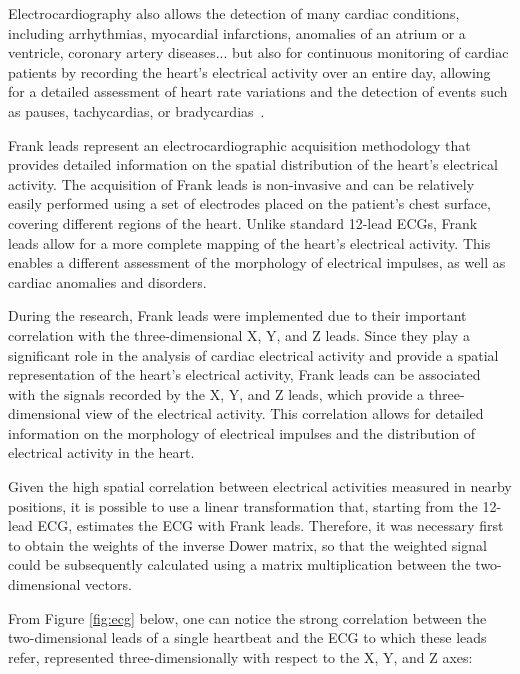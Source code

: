 \documentclass[12pt,italian]{report}
\begin{document}
Electrocardiography also allows the detection of many cardiac conditions, including arrhythmias, myocardial infarctions, anomalies of an atrium or a ventricle, coronary artery diseases... but also for continuous monitoring of cardiac patients by recording the heart's electrical activity over an entire day, allowing for a detailed assessment of heart rate variations and the detection of events such as pauses, tachycardias, or bradycardias~\cite{classification}.

Frank leads represent an electrocardiographic acquisition methodology that provides detailed information on the spatial distribution of the heart's electrical activity. The acquisition of Frank leads is non-invasive and can be relatively easily performed using a set of electrodes placed on the patient's chest surface, covering different regions of the heart. Unlike standard 12-lead ECGs, Frank leads allow for a more complete mapping of the heart's electrical activity. This enables a different assessment of the morphology of electrical impulses, as well as cardiac anomalies and disorders.

During the research, Frank leads were implemented due to their important correlation with the three-dimensional X, Y, and Z leads. Since they play a significant role in the analysis of cardiac electrical activity and provide a spatial representation of the heart's electrical activity, Frank leads can be associated with the signals recorded by the X, Y, and Z leads, which provide a three-dimensional view of the electrical activity. This correlation allows for detailed information on the morphology of electrical impulses and the distribution of electrical activity in the heart.

Given the high spatial correlation between electrical activities measured in nearby positions, it is possible to use a linear transformation that, starting from the 12-lead ECG, estimates the ECG with Frank leads. Therefore, it was necessary first to obtain the weights of the inverse Dower matrix, so that the weighted signal could be subsequently calculated using a matrix multiplication between the two-dimensional vectors.

From Figure \ref{fig:ecg} below, one can notice the strong correlation between the two-dimensional leads of a single heartbeat and the ECG to which these leads refer, represented three-dimensionally with respect to the X, Y, and Z axes:
\end{document}
